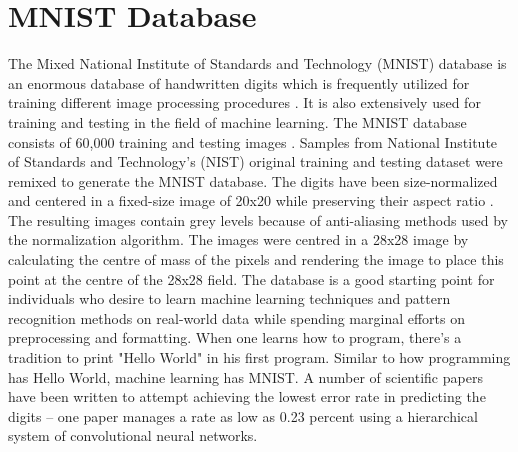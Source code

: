 \section{MNIST Database}
\label{sect5_2}
The Mixed National Institute of Standards and Technology (MNIST) database is an enormous database of handwritten digits which is frequently utilized for training different image processing procedures \cite{mnist_wiki}. It is also extensively used for training and testing in the field of machine learning. \newline\newline 
The MNIST database consists of 60,000 training and testing images \cite{mnist_kus_ernst}. Samples from National Institute of Standards and Technology’s (NIST) original training and testing dataset were remixed to generate the MNIST database. The digits have been size-normalized and centered in a fixed-size image of 20x20 while preserving their aspect ratio \cite{cnn_lecun_mnist_app}. The resulting images contain grey levels because of anti-aliasing methods used by the normalization algorithm. The images were centred in a 28x28 image by calculating the centre of mass of the pixels and rendering the image to place this point at the centre of the 28x28 field. \newline\newline
The database is a good starting point for individuals who desire to learn machine learning techniques and pattern recognition methods on real-world data while spending marginal efforts on preprocessing and formatting. When one learns how to program, there's a tradition to print "Hello World" in his first program. Similar to how programming has Hello World, machine learning has MNIST. \newline\newline
A number of scientific papers have been written to attempt achieving the lowest error rate in predicting the digits – one paper manages a rate as low as 0.23 percent using a hierarchical system of convolutional neural networks.

